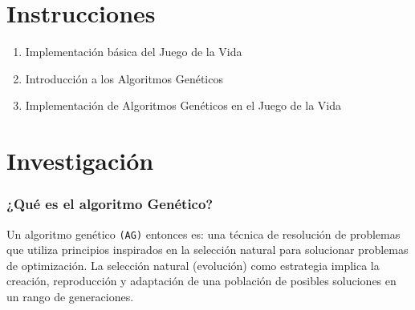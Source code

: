 \section{Instrucciones}

\begin{enumerate}
    \item Implementación básica del Juego de la Vida
    \item Introducción a los Algoritmos Genéticos
    \item Implementación de Algoritmos Genéticos en el Juego de la Vida
\end{enumerate}

\section{Investigación}

\subsubsection*{¿Qué es el algoritmo Genético?}

Un algoritmo genético \texttt{(AG)} entonces es: una técnica de resolución de problemas 
que utiliza principios inspirados en la selección natural para solucionar problemas de 
optimización. La selección natural (evolución) como estrategia implica la creación, 
reproducción y adaptación de una población de posibles soluciones en un rango de generaciones.\\ 

